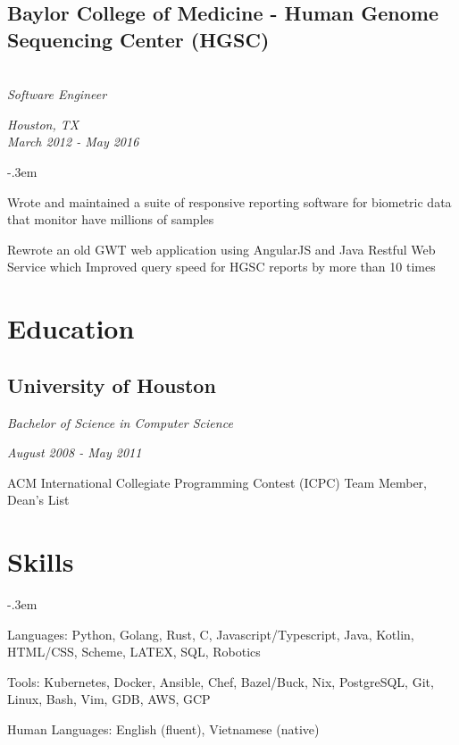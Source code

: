 \documentclass{article}
\let\olditemize=\itemize \let\endolditemize=\enditemize
\renewenvironment{itemize}{\olditemize[topsep=0em] \itemsep-.3em}{\endolditemize}
\newcommand{\entry}[2]{
  \begin{multicols}{2}
    \begin{flushleft}
        \textit{#1}
    \end{flushleft}
    \begin{flushright}
        \textit{#2}
    \end{flushright}
  \end{multicols}
}
\newenvironment{twocolentry}[2][]{
    \def\secondColumn{#2}
    \raggedright
    \setcolumnwidth{\fill, 6cm}
    \begin{paracol}{2}
}{
    \switchcolumn \raggedleft \secondColumn
    \end{paracol}
} %
\begin{document}
\begin{twocolentry}{
  \textit{Houston, TX} \\
  \textit{March 2012 - May 2016} \\
}
\subsection{Baylor College of Medicine - Human Genome Sequencing Center (HGSC)}\hfill\\
\textit{Software Engineer}
\end{twocolentry}
\begin{itemize}
  \item Wrote and maintained a suite of responsive reporting software for biometric data that monitor have millions of samples
  \item Rewrote an old GWT web application using AngularJS and Java Restful Web Service which
  Improved query speed for HGSC reports by more than 10 times
\end{itemize}

\section{Education}
\subsection{University of Houston}
\entry{Bachelor of Science in Computer Science}{August 2008 - May 2011}
ACM International Collegiate Programming Contest (ICPC) Team Member, Dean's List

\section{Skills}
\begin{itemize}
\item Languages:
  Python, Golang, Rust, C, Javascript/Typescript, Java, Kotlin, HTML/CSS,
  Scheme, LATEX, SQL, Robotics
\item Tools:
  Kubernetes, Docker, Ansible, Chef, Bazel/Buck, Nix, PostgreSQL, Git, Linux,
  Bash, Vim, GDB, AWS, GCP
\item Human Languages: English (fluent), Vietnamese (native)
\end{itemize}
\end{document}
